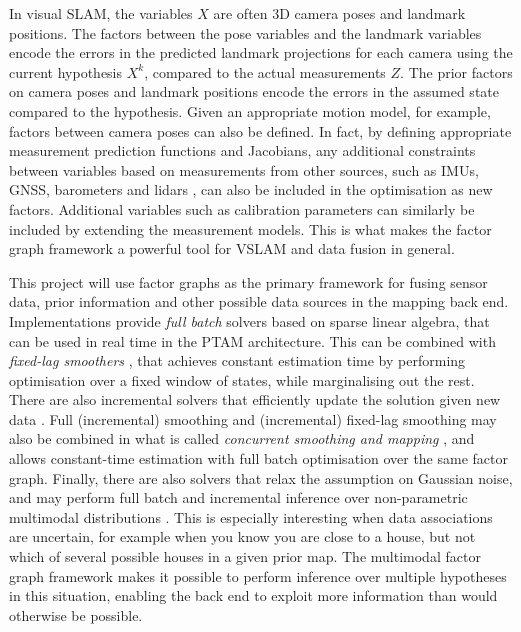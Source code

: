 In visual SLAM, the variables $X$ are often 3D camera poses and landmark positions.
The factors between the pose variables and the landmark variables encode the errors in the predicted landmark projections for each camera using the current hypothesis $X^k$, compared to the actual measurements $Z$.
The prior factors on camera poses and landmark positions encode the errors in the assumed state compared to the hypothesis.
Given an appropriate motion model, for example, factors between camera poses can also be defined.
In fact, by defining appropriate measurement prediction functions and Jacobians, any additional constraints between variables based on measurements from other sources, such as IMUs, GNSS, barometers and lidars \cite{Chiu2014}, can also be included in the optimisation as new factors.
Additional variables such as calibration parameters can similarly be included by extending the measurement models.
This is what makes the factor graph framework a powerful tool for VSLAM and data fusion in general.

This project will use factor graphs as the primary framework for fusing sensor data, prior information and other possible data sources in the mapping back end. 
Implementations \cite{Kummerle2011G2o:Optimization, KuemmerleG2oSource, Dellaert2012FactorIntroduction, Dellaert2018GTSAMSource} provide \textit{full batch} solvers based on sparse linear algebra, that can be used in real time in the PTAM architecture.
This can be combined with \textit{fixed-lag smoothers} \cite{Strasdat2011DoubleSLAM, Chiu2013}, that achieves constant estimation time by performing optimisation over a fixed window of states, while marginalising out the rest.
There are also incremental solvers that efficiently update the solution given new data \cite{Kaess2012ISAM2:Tree}.
Full (incremental) smoothing and (incremental) fixed-lag smoothing may also be combined in what is called \textit{concurrent smoothing and mapping} \cite{Kaess2012, Chiu2013}, and allows constant-time estimation with full batch optimisation over the same factor graph.
Finally, there are also solvers that relax the assumption on Gaussian noise, and may perform full batch and incremental inference over non-parametric multimodal distributions \cite{Fourie2016, Fourie2017Multi-modalGraphs, incrementalinferencejl}. 
This is especially interesting when data associations are uncertain, for example when you know you are close to a house, but not which of several possible houses in a given prior map.
The multimodal factor graph framework makes it possible to perform inference over multiple hypotheses in this situation, enabling the back end to exploit more information than would otherwise be possible.

